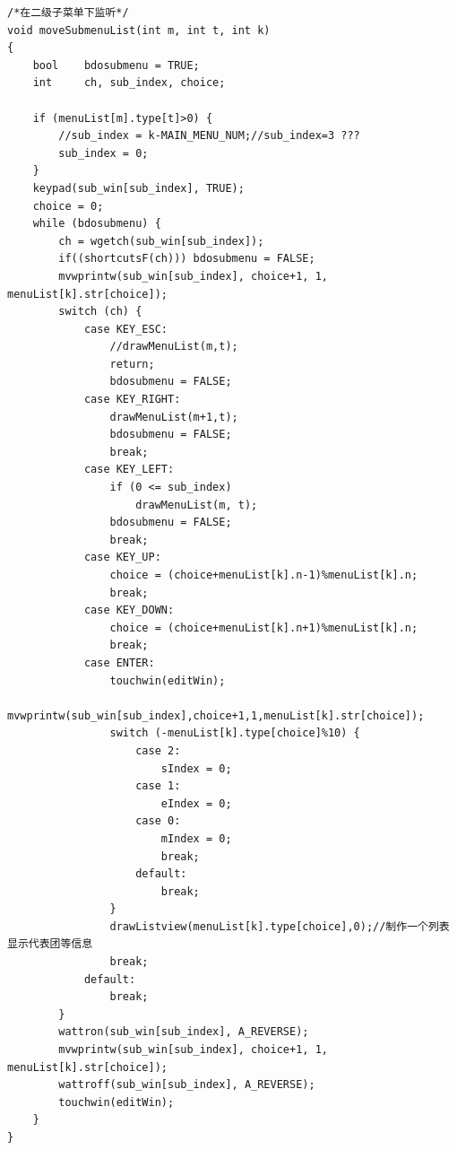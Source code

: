 \documentclass[10pt,a4paper]{article}
\begin{document}
\begin{footnotesize}
\begin{verbatim}
/*在二级子菜单下监听*/
void moveSubmenuList(int m, int t, int k)
{
    bool	bdosubmenu = TRUE;
    int		ch, sub_index, choice;

    if (menuList[m].type[t]>0) {
        //sub_index = k-MAIN_MENU_NUM;//sub_index=3 ???
        sub_index = 0;
    }
    keypad(sub_win[sub_index], TRUE);
    choice = 0;
    while (bdosubmenu) {
        ch = wgetch(sub_win[sub_index]);
        if((shortcutsF(ch))) bdosubmenu = FALSE;
        mvwprintw(sub_win[sub_index], choice+1, 1, menuList[k].str[choice]);
        switch (ch) {
            case KEY_ESC:
                //drawMenuList(m,t);
                return;
                bdosubmenu = FALSE;
            case KEY_RIGHT:
                drawMenuList(m+1,t);
                bdosubmenu = FALSE;
                break;
            case KEY_LEFT:
                if (0 <= sub_index)
                    drawMenuList(m, t);
                bdosubmenu = FALSE;
                break;
            case KEY_UP:
                choice = (choice+menuList[k].n-1)%menuList[k].n;
                break;
            case KEY_DOWN:
                choice = (choice+menuList[k].n+1)%menuList[k].n;
                break;
            case ENTER:
                touchwin(editWin);
                mvwprintw(sub_win[sub_index],choice+1,1,menuList[k].str[choice]);
                switch (-menuList[k].type[choice]%10) {
                    case 2:
                        sIndex = 0;
                    case 1:
                        eIndex = 0;
                    case 0:
                        mIndex = 0;
                        break;
                    default:
                        break;
                }
                drawListview(menuList[k].type[choice],0);//制作一个列表显示代表团等信息
                break;
            default:
                break;
        }
        wattron(sub_win[sub_index], A_REVERSE);
        mvwprintw(sub_win[sub_index], choice+1, 1, menuList[k].str[choice]);
        wattroff(sub_win[sub_index], A_REVERSE);
        touchwin(editWin);
    }
}


\end{verbatim}
\end{footnotesize}
\end{document}
